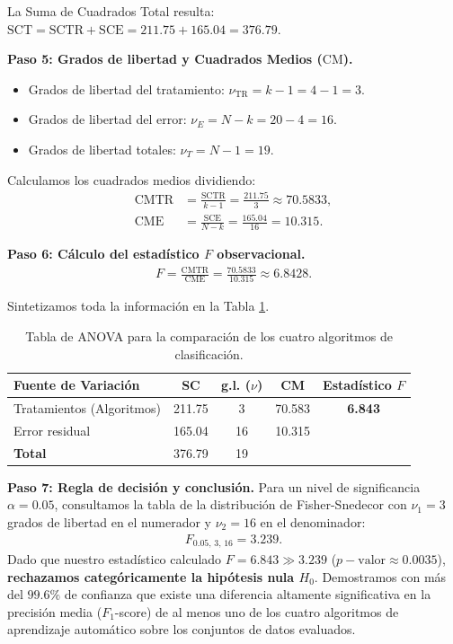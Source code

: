 \begin{solproblema}
	La Suma de Cuadrados Total resulta: $\text{SCT} = \text{SCTR} + \text{SCE} = 211.75 + 165.04 = 376.79$.
	
	\textbf{Paso 5: Grados de libertad y Cuadrados Medios ($\text{CM}$).}
	\begin{itemize}
		\item Grados de libertad del tratamiento: $\nu_{\text{TR}} = k - 1 = 4 - 1 = 3$.
		\item Grados de libertad del error: $\nu_E = N - k = 20 - 4 = 16$.
		\item Grados de libertad totales: $\nu_T = N - 1 = 19$.
	\end{itemize}
	Calculamos los cuadrados medios dividiendo:
	\begin{align}
		\text{CMTR} &= \frac{\text{SCTR}}{k - 1} = \frac{211.75}{3} \approx 70.5833, \\
		\text{CME} &= \frac{\text{SCE}}{N - k} = \frac{165.04}{16} = 10.315.
	\end{align}
	
	\textbf{Paso 6: Cálculo del estadístico $F$ observacional.}
	\begin{align}
		F = \frac{\text{CMTR}}{\text{CME}} = \frac{70.5833}{10.315} \approx 6.8428.
	\end{align}
	
	Sintetizamos toda la información en la Tabla \ref{tab:anova_sol_1}.
	\begin{table}[h!]
		\centering
		\begin{tabular}{lcccc}
			\hline
			\textbf{Fuente de Variación} & \textbf{SC} & \textbf{g.l. ($\nu$)} & \textbf{CM} & \textbf{Estadístico $F$} \\ \hline
			Tratamientos (Algoritmos) & 211.75 & 3 & 70.583 & \textbf{6.843} \\
			Error residual & 165.04 & 16 & 10.315 & \\ \hline
			\textbf{Total} & 376.79 & 19 & & \\ \hline
		\end{tabular}
		\caption{Tabla de ANOVA para la comparación de los cuatro algoritmos de clasificación.}
		\label{tab:anova_sol_1}
	\end{table}
	
	\textbf{Paso 7: Regla de decisión y conclusión.}
	Para un nivel de significancia $\alpha = 0.05$, consultamos la tabla de la distribución de Fisher-Snedecor con $\nu_1 = 3$ grados de libertad en el numerador y $\nu_2 = 16$ en el denominador:
	\begin{align}
		F_{0.05, \, 3, \, 16} = 3.239.
	\end{align}
	Dado que nuestro estadístico calculado $F = 6.843 \gg 3.239$ ($p-\text{valor} \approx 0.0035$), \textbf{rechazamos categóricamente la hipótesis nula $H_0$}. Demostramos con más del $99.6\%$ de confianza que existe una diferencia altamente significativa en la precisión media ($F_1$-score) de al menos uno de los cuatro algoritmos de aprendizaje automático sobre los conjuntos de datos evaluados.
\end{solproblema}

